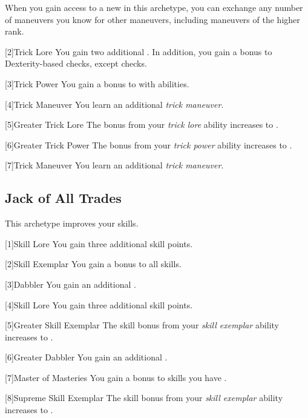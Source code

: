         When you gain access to a new  in this archetype,
            you can exchange any number of maneuvers you know for other maneuvers,
            including maneuvers of the higher rank.

        [2]{Trick Lore} You gain two additional .
        In addition, you gain a  bonus to Dexterity-based checks, except  checks.

        [3]{Trick Power} You gain a  bonus to  with  abilities.

        [4]{Trick Maneuver}
        You learn an additional \textit{trick maneuver}.

        [5]{Greater Trick Lore} The bonus from your \textit{trick lore} ability increases to .

        [6]{Greater Trick Power} The bonus from your \textit{trick power} ability increases to .

        [7]{Trick Maneuver}
        You learn an additional \textit{trick maneuver}.

    \subsection{Jack of All Trades}
        This archetype improves your skills.

        [1]{Skill Lore} You gain three additional skill points.

        [2]{Skill Exemplar} You gain a  bonus to all skills.

        [3]{Dabbler} You gain an additional .

        [4]{Skill Lore} You gain three additional skill points.

        [5]{Greater Skill Exemplar} The skill bonus from your \textit{skill exemplar} ability increases to .

        [6]{Greater Dabbler} You gain an additional .

        [7]{Master of Masteries} You gain a  bonus to skills you have .

        [8]{Supreme Skill Exemplar} The skill bonus from your \textit{skill exemplar} ability increases to .


